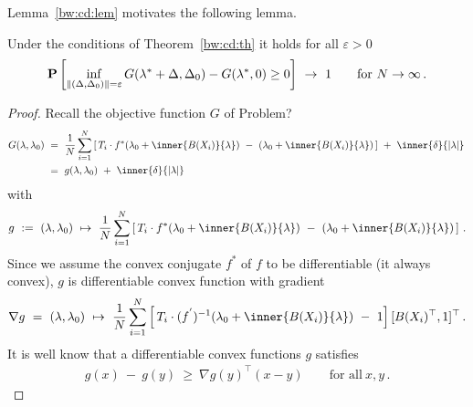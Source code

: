 Lemma~\ref{bw:cd:lem} motivates the following lemma.
 \begin{lemma}
   \label{bw:cd:lem2}
   Under the conditions of Theorem~\ref{bw:cd:th} it holds
   for all $\varepsilon>0$
\begin{gather}
   \P
   \left[ 
     \inf _ { 
       \norm{
         (
     \Delta
     ,
     \Delta_0
         )
 } 
= \varepsilon }
     G
     (
     \lambda^*
      +
      \Delta
      ,
     \Delta_0
     )
     -
     G
     (
     \lambda^*,
     0
     )
     \ge 
     0
   \right]
   \ 
   \to
   \ 
   1
   \qquad
   \text{for}
   \ 
   N\to\infty
   \,.
\end{gather}
 \end{lemma}
 \begin{proof}
  Recall the objective function $G$ of Problem? 
\begin{align*}
  G(\lambda,\lambda_0)
  &
  \ 
  =
  \ 
    \frac{1}{N}
\sum_{i=1} 
  ^N
  \left[ 
    \,
  T_i
  \cdot
  f^*
  \!
  \left( 
\lambda_0
+
\inner
{B(X_i)}
{\lambda}
  \right)
  \ 
-
\ 
  \left( 
\lambda_0
+
\inner
{B(X_i)}
{\lambda}
  \right)
  \,
  \right]
  \ 
+
\ 
\inner
{\delta}
{|\lambda|}
\,
\\
  &
\ 
=
\ 
g(\lambda,\lambda_0)
\ 
+
\ 
\inner
{\delta}
{|\lambda|}
\,
\end{align*}
with
  \begin{gather}
    g
    \ 
    := 
    \ 
    (\lambda,\lambda_0)
    \ 
    \mapsto
    \ 
    \frac{1}{N}
\sum_{i=1} 
  ^N
  \left[ 
    \,
  T_i
  \cdot
  f^*
  \!
  \left( 
\lambda_0
+
\inner
{B(X_i)}
{\lambda}
  \right)
  \ 
-
\ 
  \left( 
\lambda_0
+
\inner
{B(X_i)}
{\lambda}
  \right)
  \,
  \right]
  \,.
  \end{gather}
   Since we assume the convex conjugate $f^*$ of $f$ to be differentiable
   (it always convex),
   $g$ is differentiable convex function with gradient 
  \begin{gather*}
    \nabla
    g
    \ 
    =
    \ 
    (\lambda,\lambda_0)
    \ 
    \mapsto
    \ 
\frac{1}{N}
\sum_{i=1} 
  ^N
  \left[ 
    \,
  T_i
  \cdot
  (f^{'})^{-1}
  \!
  \left( 
\lambda_0
+
\inner
{B(X_i)}
{\lambda}
  \right)
  \ 
-
\ 
1
  \right]
  [
  B(X_i)^\top
  ,
  1
  ]^\top
  \,.
  \end{gather*}
It is well know that a differentiable convex functions $g$ satisfies
  \begin{gather*}
    g(x)
    \ 
    -
    \ 
    g(y)
    \ 
    \ge
    \ 
    \nabla
    g(y)^\top
    (x-y)
    \qquad 
    \text{for all}\ 
    x,y\,.
  \end{gather*}

\end{proof}
